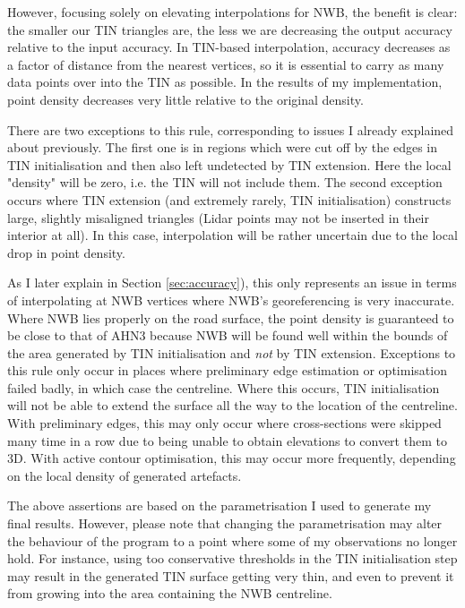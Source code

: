 However, focusing solely on elevating interpolations for NWB, the benefit is clear: the smaller our TIN triangles are, the less we are decreasing the output accuracy relative to the input accuracy. In TIN-based interpolation, accuracy decreases as a factor of distance from the nearest vertices, so it is essential to carry as many data points over into the TIN as possible. In the results of my implementation, point density decreases very little relative to the original density.

There are two exceptions to this rule, corresponding to issues I already explained about previously. The first one is in regions which were cut off by the edges in TIN initialisation and then also left undetected by TIN extension. Here the local "density" will be zero, i.e. the TIN will not include them. The second exception occurs where TIN extension (and extremely rarely, TIN initialisation) constructs large, slightly misaligned triangles (Lidar points may not be inserted in their interior at all). In this case, interpolation will be rather uncertain due to the local drop in point density.

As I later explain in Section \ref{sec:accuracy}), this only represents an issue in terms of interpolating at NWB vertices where NWB's georeferencing is very inaccurate. Where NWB lies properly on the road surface, the point density is guaranteed to be close to that of AHN3 because NWB will be found well within the bounds of the area generated by TIN initialisation and \textit{not} by TIN extension. Exceptions to this rule only occur in places where preliminary edge estimation or optimisation failed badly, in which case the centreline. Where this occurs, TIN initialisation will not be able to extend the surface all the way to the location of the centreline. With preliminary edges, this may only occur where cross-sections were skipped many time in a row due to being unable to obtain elevations to convert them to 3D. With active contour optimisation, this may occur more frequently, depending on the local density of generated artefacts.

The above assertions are based on the parametrisation I used to generate my final results. However, please note that changing the parametrisation may alter the behaviour of the program to a point where some of my observations no longer hold. For instance, using too conservative thresholds in the TIN initialisation step may result in the generated TIN surface getting very thin, and even to prevent it from growing into the area containing the NWB centreline.

